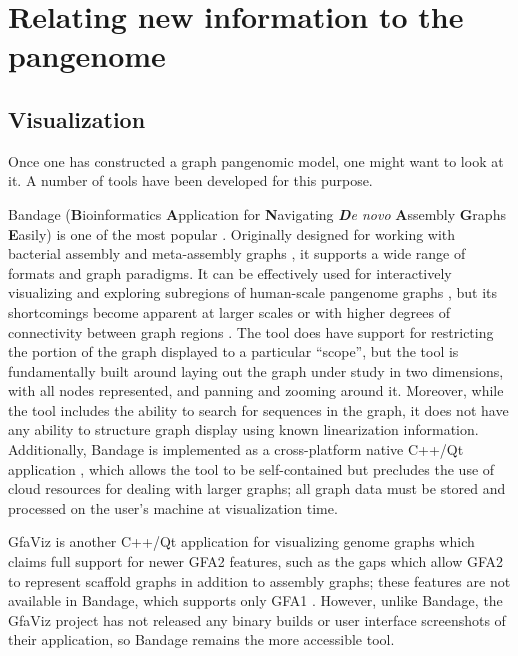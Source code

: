 \section{Relating new information to the pangenome}

\subsection{Visualization}

Once one has constructed a graph pangenomic model, one might want to look at it.
A number of tools have been developed for this purpose.

Bandage (\textbf{B}ioinformatics \textbf{A}pplication for \textbf{N}avigating \textit{\textbf{D}e novo} \textbf{A}ssembly \textbf{G}raphs \textbf{E}asily) \citep{Wick_2015} is one of the most popular \citep{Mikheenko_2019}.
Originally designed for working with bacterial assembly and meta-assembly graphs \citep{Wick_2015}, it supports a wide range of formats and graph  paradigms.
It can be effectively used for interactively visualizing and exploring subregions of human-scale pangenome graphs \citep{Garrison_2019}, but its shortcomings become apparent at larger scales or with higher degrees of connectivity between graph regions \citep{Mikheenko_2019}.
The tool does have support for restricting the portion of the graph displayed to a particular ``scope'', but the tool is fundamentally built around laying out the graph under study in two dimensions, with all nodes represented, and panning and zooming around it.
Moreover, while the tool includes the ability to search for sequences in the graph, it does not have any ability to structure graph display using known linearization information.
Additionally, Bandage is implemented as a cross-platform native C++/Qt application \citep{Wick_2015}, which allows the tool to be self-contained but precludes the use of cloud resources for dealing with larger graphs; all graph data must be stored and processed on the user's machine at visualization time.

GfaViz is another C++/Qt application for visualizing genome graphs which claims full support for newer GFA2 features, such as the gaps which allow GFA2 to represent scaffold graphs in addition to assembly graphs; these features are not available in Bandage, which supports only GFA1 \citep{Gonnella_2018}.
However, unlike Bandage, the GfaViz project has not released any binary builds or user interface screenshots of their application, so Bandage remains the more accessible tool.

